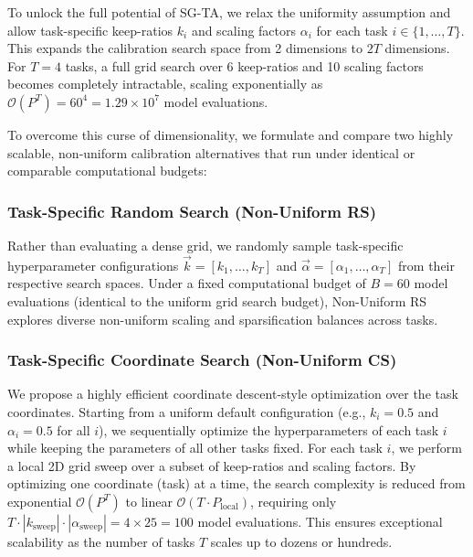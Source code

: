 To unlock the full potential of SG-TA, we relax the uniformity assumption and allow task-specific keep-ratios $k_i$ and scaling factors $\alpha_i$ for each task $i \in \{1, \dots, T\}$. This expands the calibration search space from 2 dimensions to $2T$ dimensions. For $T=4$ tasks, a full grid search over 6 keep-ratios and 10 scaling factors becomes completely intractable, scaling exponentially as $\mathcal{O}(P^T) = 60^4 = 1.29 \times 10^7$ model evaluations.

To overcome this curse of dimensionality, we formulate and compare two highly scalable, non-uniform calibration alternatives that run under identical or comparable computational budgets:

\subsubsection{Task-Specific Random Search (Non-Uniform RS)}
Rather than evaluating a dense grid, we randomly sample task-specific hyperparameter configurations $\vec{k} = [k_1, \dots, k_T]$ and $\vec{\alpha} = [\alpha_1, \dots, \alpha_T]$ from their respective search spaces. Under a fixed computational budget of $B = 60$ model evaluations (identical to the uniform grid search budget), Non-Uniform RS explores diverse non-uniform scaling and sparsification balances across tasks.

\subsubsection{Task-Specific Coordinate Search (Non-Uniform CS)}
We propose a highly efficient coordinate descent-style optimization over the task coordinates. Starting from a uniform default configuration (e.g., $k_i = 0.5$ and $\alpha_i = 0.5$ for all $i$), we sequentially optimize the hyperparameters of each task $i$ while keeping the parameters of all other tasks fixed. For each task $i$, we perform a local 2D grid sweep over a subset of keep-ratios and scaling factors. By optimizing one coordinate (task) at a time, the search complexity is reduced from exponential $\mathcal{O}(P^T)$ to linear $\mathcal{O}(T \cdot P_{\text{local}})$, requiring only $T \cdot |k_{\text{sweep}}| \cdot |\alpha_{\text{sweep}}| = 4 \times 25 = 100$ model evaluations. This ensures exceptional scalability as the number of tasks $T$ scales up to dozens or hundreds.

